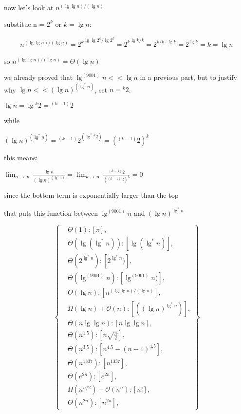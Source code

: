 \documentclass[11pt,fleqn]{article}
\theoremstyle{definition}
\theoremstyle{remark}
\begin{document}
now let's look at $n^{({\lg \lg n})/({\lg n})}$

substitue n = $2^k$ or $k = \lg n$:

\begin{align*}
n^{({\lg \lg n})/({\lg n})} =
{2^k}^{{\lg \lg {2^k}} / \lg {2^k}}=
{2^k}^{{\lg k} / k} = 
2^{{k/k} \cdot \lg k} = 
2^{\lg k} =
k =
\lg n
\end{align*}

so $n^{({\lg \lg n})/({\lg n})} = \Theta(\lg n)$

we already proved that $\lg^{(9001)} n << \lg n$ in a previous part,
but to justify why $\lg n << {(\lg n)}^{(\lg^* n)}$, set $n = {}^k 2$.

$\lg n = \lg {}^k 2 = {}^{(k-1)} 2$ 

while

${(\lg n)}^{(\lg^* n)} = {{}^{(k-1)} 2}^{(\lg^* {}^k 2)} = {({}^{(k-1)} 2)}^{k}$

this means:

$\lim_{n \to \infty} \frac{\lg n}{{(\lg n)}^{(\lg^* n)}} = \lim_{k \to \infty} \frac{{}^{(k-1)} 2}{{({}^{(k-1)} 2)}^{k}} = 0$

since the bottom term is exponentially larger than the top

that puts this function between $\lg^{(9001)} n$ and ${(\lg n)}^{\lg^*{n}}$

\[
\left\{
\begin{aligned}
& \Theta(1): [\pi],\\
& \Theta(\lg(\lg^*n)): [\lg(\lg^*n)],\\
& \Theta(2^{\lg^*n}): [2^{\lg^*n})],\\
& \Theta(\lg^{(9001)} n): [\lg^{(9001)} n)],\\
& \Theta(\lg n): [n^{({\lg \lg n})/({\lg n})}],\\
& \Omega(\lg n) + \mathcal{O}(n): [({(\lg n)}^{\lg^*{n}})],\\
& \Theta(n\lg \lg n): [n\lg \lg n],\\
& \Theta(n^{1.5}): [n\sqrt{\frac{n}{2}}],\\
& \Theta(n^{3.5}): [n^{4.5} - (n - 1)^{4.5}],\\ 
& \Theta(n^{1337}): [n^{1337}],\\
& \Theta(e^{2n}): [e^{2n}],\\
& \Omega(n^{n/2}) + \mathcal{O}(n^n): [n!],\\
& \Theta(n^{2n}): [n^{2n}],
\end{aligned}
\right\}
\]\\
\end{document}
